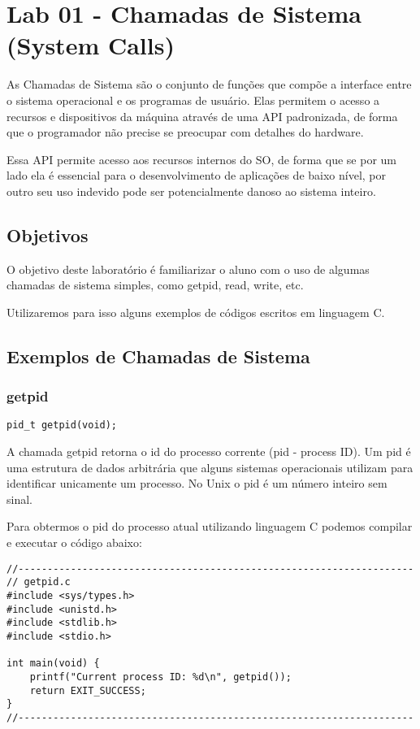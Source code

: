 \chapter{Lab 01 - Chamadas de Sistema (System Calls)}

As Chamadas de Sistema são o conjunto de funções que compõe a interface entre o sistema operacional e os programas de usuário. Elas permitem o acesso a recursos e dispositivos da máquina através de uma API padronizada, de forma que o programador não precise se preocupar com detalhes do hardware.

Essa API permite acesso aos recursos internos do SO, de forma que se por um lado ela é essencial para o desenvolvimento de aplicações de baixo nível, por outro seu uso indevido pode ser potencialmente danoso ao sistema inteiro.

\section{Objetivos}

O objetivo deste laboratório é familiarizar o aluno com o uso de algumas chamadas de sistema simples, como getpid, read, write, etc.

Utilizaremos para isso alguns exemplos de códigos escritos em linguagem C.

\section{Exemplos de Chamadas de Sistema}

\subsection{getpid}

\begin{verbatim}
pid_t getpid(void);
\end{verbatim}

A chamada getpid retorna o id do processo corrente (pid - process ID). Um pid é uma estrutura de dados arbitrária que alguns sistemas operacionais utilizam para identificar unicamente um processo. No Unix o pid é um número inteiro sem sinal.

Para obtermos o pid do processo atual utilizando linguagem C podemos compilar e executar o código abaixo:

\newpage

\begin{espacosimples}
\begin{verbatim}
//--------------------------------------------------------------------
// getpid.c
#include <sys/types.h>
#include <unistd.h>
#include <stdlib.h>
#include <stdio.h>

int main(void) {
    printf("Current process ID: %d\n", getpid());
    return EXIT_SUCCESS;
}
//--------------------------------------------------------------------
\end{verbatim}
\end{espacosimples}

